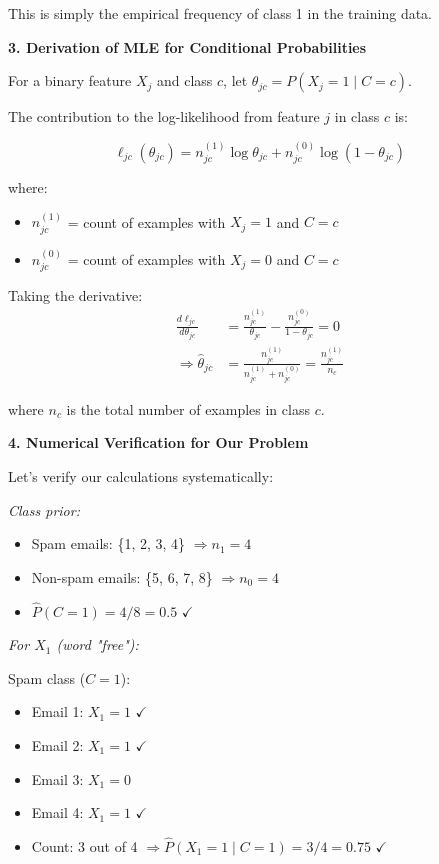 \documentclass[12pt]{article}
\begin{document}
\begin{explanation}
This is simply the empirical frequency of class 1 in the training data.

\textbf{3. Derivation of MLE for Conditional Probabilities}

For a binary feature $X_j$ and class $c$, let $\theta_{jc} = P(X_j = 1 \mid C = c)$.

The contribution to the log-likelihood from feature $j$ in class $c$ is:

\[
\ell_{jc}(\theta_{jc}) = n_{jc}^{(1)} \log \theta_{jc} + n_{jc}^{(0)} \log(1 - \theta_{jc})
\]

where:
\begin{itemize}
    \item $n_{jc}^{(1)}$ = count of examples with $X_j = 1$ and $C = c$
    \item $n_{jc}^{(0)}$ = count of examples with $X_j = 0$ and $C = c$
\end{itemize}

Taking the derivative:
\begin{align}
\frac{d\ell_{jc}}{d\theta_{jc}} &= \frac{n_{jc}^{(1)}}{\theta_{jc}} - \frac{n_{jc}^{(0)}}{1-\theta_{jc}} = 0 \\
\Rightarrow \hat{\theta}_{jc} &= \frac{n_{jc}^{(1)}}{n_{jc}^{(1)} + n_{jc}^{(0)}} = \frac{n_{jc}^{(1)}}{n_c}
\end{align}

where $n_c$ is the total number of examples in class $c$.

\textbf{4. Numerical Verification for Our Problem}

Let's verify our calculations systematically:

\textit{Class prior:}
\begin{itemize}
    \item Spam emails: \{1, 2, 3, 4\} $\Rightarrow n_1 = 4$
    \item Non-spam emails: \{5, 6, 7, 8\} $\Rightarrow n_0 = 4$
    \item $\hat{P}(C = 1) = 4/8 = 0.5$ $\checkmark$
\end{itemize}

\textit{For $X_1$ (word "free"):}

Spam class ($C = 1$):
\begin{itemize}
    \item Email 1: $X_1 = 1$ $\checkmark$
    \item Email 2: $X_1 = 1$ $\checkmark$
    \item Email 3: $X_1 = 0$
    \item Email 4: $X_1 = 1$ $\checkmark$
    \item Count: 3 out of 4 $\Rightarrow \hat{P}(X_1 = 1 \mid C = 1) = 3/4 = 0.75$ $\checkmark$
\end{itemize}


\end{explanation}
\end{document}
